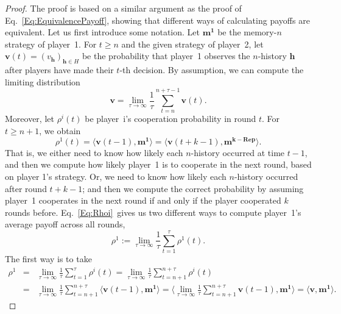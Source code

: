 \documentclass[11pt]{article}
\theoremstyle{plainCl1}
\theoremstyle{plainCl2}
\begin{document}
\begin{proof}
The proof is based on a similar argument as the proof of Eq.~\eqref{Eq:EquivalencePayoff}, showing that different ways of calculating payoffs are equivalent. 
Let us first introduce some notation. 
Let $\mathbf{m^1}$ be the memory-$n$ strategy of player~1. 
For $t\!\ge\!n$ and the given strategy of player~2, let $\mathbf{v}(t)\!=\!(v_\mathbf{h})_{\mathbf{h}\in H}$ be the probability that player~1 observes the $n$-history $\mathbf{h}$ after players have made their $t$-th decision. 
By assumption, we can compute the limiting distribution
\begin{equation} \label{Eq:TimeAverageAppendix}
\mathbf{v} = \lim_{\tau\to\infty} \frac{1}{\tau} \sum_{t=n}^{n+\tau-1} \mathbf{v}(t).  
\end{equation}
Moreover, let $\rho^i(t)$ be player~i's cooperation probability in round $t$. 
For $t\!\ge\!n\!+\!1$, we obtain 
\begin{equation} \label{Eq:Rhoi}
\rho^1(t) = \big\langle \mathbf{v}(t\!-\!1) , \mathbf{m^1}\big\rangle = \big\langle \mathbf{v}(t\!+\!k\!-\!1), \mathbf{m^{k-\text{Rep}}}\big\rangle.
\end{equation}
That is, we either need to know how likely each $n$-history occurred at time $t\!-\!1$, and then we compute how likely player~1 is to cooperate in the next round, based on player 1's strategy. 
Or, we need to know how likely each $n$-history occurred after round $t\!+\!k\!-\!1$; and then we compute the correct probability by assuming player~1 cooperates in the next round if and only if the player cooperated $k$ rounds before. 
Eq.~\eqref{Eq:Rhoi}~gives us two different ways to compute player~1's average payoff across all rounds,
\begin{equation}
\rho^1 := \lim_{\tau \to \infty} \frac{1}{\tau} \sum_{t=1}^\tau \rho^1(t).
\end{equation}
The first way is to take
\begin{equation*}
\begin{array}{rcl}
\rho^1 &= &\displaystyle 
\lim_{\tau \to \infty} \frac{1}{\tau} \sum_{t=1}^\tau \rho^i(t) 
= \lim_{\tau \to \infty} \frac{1}{\tau} \sum_{t=n+1}^{n+\tau} \rho^i(t)\\[0.5cm]
&= &\displaystyle 
\lim_{\tau \to \infty} \frac{1}{\tau} \sum_{t=n+1}^{n+\tau}  \big\langle \mathbf{v}(t\!-\!1) , \mathbf{m^1}\big\rangle 
=  \big\langle  \lim_{\tau \to \infty} \frac{1}{\tau} \sum_{t=n+1}^{n+\tau} \mathbf{v}(t\!-\!1) , \mathbf{m^1}\big\rangle
= \big\langle \mathbf{v},\mathbf{m^1} \big\rangle.

\end{array}
\end{equation*}
\end{proof}
\end{document}
